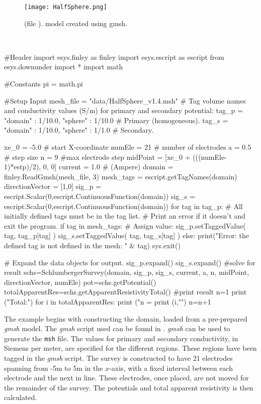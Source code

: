 \begin{figure}
\centering
\texttt{[image: HalfSphere.png]}
\caption{
    (file ). model created using gmsh.}
\label{fig:HalfSphere}
\end{figure}

\begin{pyc}\label{code: dc1}
\
\begin{python}
#Header
import esys.finley      as finley
import esys.escript     as escript
from esys.downunder     import *
import math

#Constants
pi = math.pi

#Setup Input
mesh_file = "data/HalfSphere_v1.4.msh"
# Tag volume names and conductivity values (S/m) for primary and secondary potential:
tag_p = {"domain" : 1/10.0, "sphere" :  1/10.0} # Primary (homogeneous).
tag_s = {"domain" : 1/10.0, "sphere" :  1/1.0 } # Secondary.

xe_0 = -5.0 # start X-coordinate
numEle =  21  # number of electrodes
a =  0.5 # step size
n = 9 #max electrode step
midPoint = [xe_0 + (((numEle-1)*estp)/2), 0, 0]
current = 1.0 # (Ampere)
domain = finley.ReadGmsh(mesh_file, 3)
mesh_tags = escript.getTagNames(domain)
directionVector = [1,0]
sig_p = escript.Scalar(0,escript.ContinuousFunction(domain))
sig_s = escript.Scalar(0,escript.ContinuousFunction(domain))
for tag in tag_p:
    # All initially defined tags must be in the tag list.
    # Print an error if it doesn't and exit the program.
    if tag in mesh_tags:
        # Assign value:
        sig_p.setTaggedValue( tag, tag_p[tag] )
        sig_s.setTaggedValue( tag, tag_s[tag] )
    else:
        print("Error: the defined tag is not defined in the mesh: " & tag)
        sys.exit()

# Expand the data objects for output.
sig_p.expand()
sig_s.expand()
#solve for result
schs=SchlumbergerSurvey(domain, sig_p, sig_s, current, a, n, midPoint, directionVector, numEle)
pot=schs.getPotential()
totalApparentRes=schs.getApparentResistivityTotal()
#print result
n=1
print ("Total:\n")
for i in totalApparentRes:
    print ("n = %
    print (i,"\n")
    n=n+1
\end{python}
\end{pyc}


The example begins with constructing the domain, loaded from a pre-prepared
\emph{gmsh} model. The \emph{gmsh} script used can be found in .
\emph{gmsh} can be used to generate the \texttt{msh} file. The values for primary and secondary 
conductivity, in Siemens per meter, are specified for the different regions. These regions have been tagged
in the \emph{gmsh} script. The survey is constructed to have 21 electrodes spanning from -5m to 5m
in the $x$-axis, with a fixed interval between each electrode and the next in 
line. These electrodes, once placed, are not moved for the remainder of the
survey. The potentials and total apparent resistivity is then calculated.

